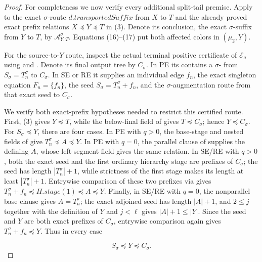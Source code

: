 \begin{proof}
For completeness we now verify every additional split-tail premise.  Apply
 to the exact
$\sigma$-route $d.\mathit{transportedSuffix}$ from $X$ to $T$ and the
already proved exact prefix relations $X\preccurlyeq Y\preccurlyeq T$ in
(3).  Denote its conclusion, the exact $\sigma$-suffix from $Y$ to $T$,
by $\mathcal A_{Y,T}^{\sigma}$.  Equations (16)--(17) put both affected
colors in $(\mu_2,Y)$.

For the source-to-$Y$ route, inspect the actual terminal positive
certificate of $\mathcal E_\sigma$ using  and
.  Denote its final output tree by
$C_\sigma$.  In PE its  contains a
$\sigma$- from
$S_\sigma=T_n^\sigma$ to $C_\sigma$.  In SE or RE it supplies an
individual edge $f_n$, the exact singleton equation $F_n=\{f_n\}$, the
 seed
$S_\sigma=T_n^\sigma+f_n$, and the $\sigma$-augmentation route from that
exact seed to $C_\sigma$.

We verify both exact-prefix hypotheses needed to restrict this certified
route.  First, (3) gives $Y\preccurlyeq T$, while the below-final field of
 gives $T\preccurlyeq C_\sigma$; hence
$Y\preccurlyeq C_\sigma$.  For $S_\sigma\preccurlyeq Y$, there are four
cases.  In PE with $q>0$, the base-stage and nested fields of
 give
$T_n^\sigma\preccurlyeq A\preccurlyeq Y$.  In PE with $q=0$, the
parallel clause of  supplies the
 defining $A$, whose left-segment field gives
the same relation.  In SE/RE with $q>0$, both the exact seed and the first
ordinary hierarchy stage are prefixes of $C_\sigma$; the seed has length
$|T_n^\sigma|+1$, while strictness of the first stage makes its length at
least $|T_n^\sigma|+1$.  Entrywise comparison of these two prefixes via
 gives
$T_n^\sigma+f_n\preccurlyeq H.\mathit{stage}(1)
 \preccurlyeq A\preccurlyeq Y$.  Finally, in SE/RE with $q=0$, the
nonparallel base clause gives $A=T_n^\sigma$; the exact adjoined seed has
length $|A|+1$, and $2\le j$ together with the definition of $Y$ and
$j<\ell$ gives $|A|+1\le |Y|$.  Since the seed and $Y$ are both exact
prefixes of $C_\sigma$, entrywise comparison again gives
$T_n^\sigma+f_n\preccurlyeq Y$.  Thus in every case

\[
 S_\sigma\preccurlyeq Y\preccurlyeq C_\sigma.                 \tag{18a}
\]


\end{proof}
